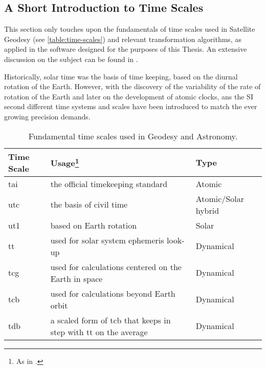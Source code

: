 \subsection{A Short Introduction to Time Scales}\label{ssec:time-scales}

This section only touches upon the fundamentals of time scales used in Satellite Geodesy 
(see \autoref{table:time-scales}) 
and relevant transformation algorithms, as applied in the software designed for the 
purposes of this Thesis. An extensive discussion on the subject can be found in 
\cite{Urban2013}.

Historically, solar time was the basis of time keeping, based on the diurnal rotation
of the Earth. However, with the  discovery of the variability of the 
rate of rotation of the Earth and later on the development of atomic clocks, 
ans the SI second different time systems and scales have been introduced to match the 
ever growing precision demands.

\begin{table}[h!]
  \centering
  \begin{tabular}{p{7cm}p{5cm}p{1cm}}
      \textbf{Time Scale} & \textbf{Usage\footnote{As in \cite{sofa2021ts}.}} & \textbf{Type} \\
      \hline
      \gls{tai} & the official timekeeping standard & Atomic \\
      \gls{utc} & the basis of civil time & Atomic/Solar hybrid\\
      \gls{ut1} & based on Earth rotation & Solar \\
      \gls{tt}  & used for solar system ephemeris look-up & Dynamical\\
      \gls{tcg} & used for calculations centered on the Earth in space  & Dynamical\\
      \gls{tcb} & used for calculations beyond Earth orbit  & Dynamical\\
      \gls{tdb} & a scaled form of \gls{tcb} that keeps in step with \gls{tt} on the average  & Dynamical\\
      \hline
  \end{tabular}
  \caption{Fundamental time scales used in Geodesy and Astronomy.}
  \label{table:time-scales}
\end{table}


